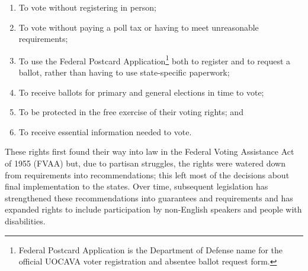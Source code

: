 \begin{enumerate}
  \item To vote without registering in person;
  \item To vote without paying a poll tax or having to meet
    unreasonable requirements;
  \item To use the Federal Postcard Application\footnote{Federal
      Postcard Application is the Department of Defense name for the
      official UOCAVA voter registration and absentee ballot request
      form.} both to register and to request a ballot, rather than
    having to use state-specific paperwork;
  \item To receive ballots for primary and general elections in time to vote;
  \item To be protected in the free exercise of their voting rights;
    and 
  \item To receive essential information needed to vote.
\end{enumerate}

These rights first found their way into law in the Federal Voting
Assistance Act of 1955 (FVAA) but, due to partisan struggles, the
rights were watered down from requirements into recommendations; this
left most of the decisions about final implementation to the
states. Over time, subsequent legislation has strengthened these
recommendations into guarantees and requirements and has expanded
rights to include participation by non-English speakers and people
with disabilities.






